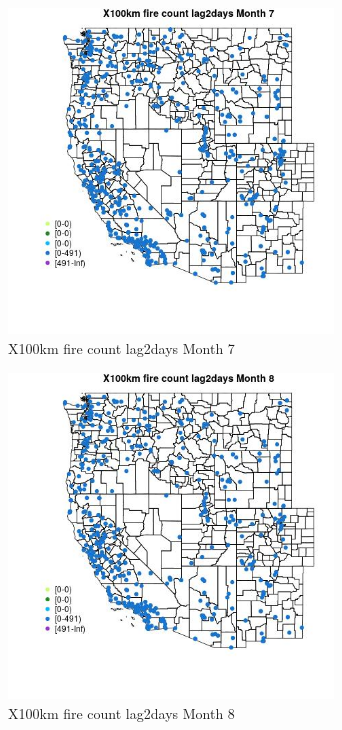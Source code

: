 \begin{figure} 
\centering  
\includegraphics[width=0.77\textwidth]{Code_Outputs/Report_ML_input_PM25_Step4_part_e_de_duplicated_aves_compiled_2019-05-14wNAs_MapObsMo7X100km_fire_count_lag2days.jpg} 
\caption{\label{fig:Report_ML_input_PM25_Step4_part_e_de_duplicated_aves_compiled_2019-05-14wNAsMapObsMo7X100km_fire_count_lag2days}X100km fire count lag2days Month 7} 
\end{figure} 
 

\begin{figure} 
\centering  
\includegraphics[width=0.77\textwidth]{Code_Outputs/Report_ML_input_PM25_Step4_part_e_de_duplicated_aves_compiled_2019-05-14wNAs_MapObsMo8X100km_fire_count_lag2days.jpg} 
\caption{\label{fig:Report_ML_input_PM25_Step4_part_e_de_duplicated_aves_compiled_2019-05-14wNAsMapObsMo8X100km_fire_count_lag2days}X100km fire count lag2days Month 8} 
\end{figure} 
 

